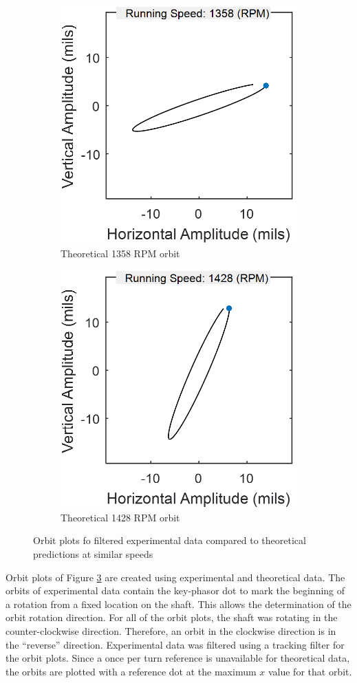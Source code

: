 \begin{figure}[H]
\begin{subfigure}[b]{.5\linewidth}
				\includegraphics[width=.75\textwidth]{./figures/Images/Figure_16c}
				\caption{Theoretical 1358 RPM orbit}
				\label{fig:Figure_16c}
			\end{subfigure}
			\begin{subfigure}[b]{.5\linewidth}
				\centering
				\includegraphics[width=.75\textwidth]{./figures/Images/Figure_16d}
				\caption{Theoretical 1428 RPM orbit}
				\label{fig:Figure_16d}
			\end{subfigure}
			\caption{Orbit plots fo filtered experimental data compared to theoretical predictions at similar speeds}
			\label{fig:Figure_16}
		\end{figure}
		Orbit plots of Figure \ref{fig:Figure_16} are created using experimental and theoretical data. The orbits of experimental data contain the key-phasor dot to mark the beginning of a rotation from a fixed location on the shaft. This allows the determination of the orbit rotation direction. For all of the orbit plots, the shaft was rotating in the counter-clockwise direction. Therefore, an orbit in the clockwise direction is in the “reverse” direction. Experimental data was filtered using a tracking filter for the orbit plots. Since a once per turn reference is unavailable for theoretical data, the orbits are plotted with a reference dot at the maximum $x$ value for that orbit.\par 
